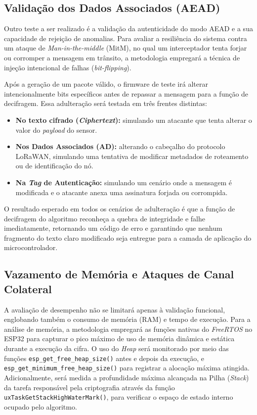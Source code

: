 
\subsection{Validação dos Dados Associados (AEAD)}
Outro teste a ser realizado é a validação da autenticidade do modo AEAD e a sua capacidade de rejeição de anomalias. Para avaliar a resiliência do sistema contra um ataque de \textit{Man-in-the-middle} (MitM), no qual um interceptador tenta forjar ou corromper a mensagem em trânsito, a metodologia empregará a técnica de injeção intencional de falhas (\textit{bit-flipping}).

Após a geração de um pacote válido, o firmware de teste irá alterar intencionalmente bits específicos antes de repassar a mensagem para a função de decifragem. Essa adulteração será testada em três frentes distintas:
\begin{itemize}
\item \textbf{No texto cifrado (\textit{Ciphertext}):} simulando um atacante que tenta alterar o valor do \textit{payload} do sensor.
\item \textbf{Nos Dados Associados (AD):} alterando o cabeçalho do protocolo LoRaWAN, simulando uma tentativa de modificar metadados de roteamento ou de identificação do nó.
\item \textbf{Na \textit{Tag} de Autenticação:} simulando um cenário onde a mensagem é modificada e o atacante anexa uma assinatura forjada ou corrompida.
\end{itemize}

O resultado esperado em todos os cenários de adulteração é que a função de decifragem do algoritmo reconheça a quebra de integridade e falhe imediatamente, retornando um código de erro e garantindo que nenhum fragmento do texto claro modificado seja entregue para a camada de aplicação do microcontrolador.


\subsection{Vazamento de Memória e Ataques de Canal Colateral}
A avaliação de desempenho não se limitará apenas à validação funcional, englobando também o consumo de memória (RAM) e tempo de execução. Para a análise de memória, a metodologia empregará as funções nativas do \textit{FreeRTOS} no ESP32 para capturar o pico máximo de uso de memória dinâmica e estática durante a execução da cifra. O uso do \textit{Heap} será monitorado por meio das funções \texttt{esp\_get\_free\_heap\_size()} antes e depois da execução, e \texttt{esp\_get\_minimum\_free\_heap\_size()} para registrar a alocação máxima atingida. Adicionalmente, será medida a profundidade máxima alcançada na Pilha (\textit{Stack}) da tarefa responsável pela criptografia através da função \texttt{uxTaskGetStackHighWaterMark()}, para verificar o espaço de estado interno ocupado pelo algoritmo.


